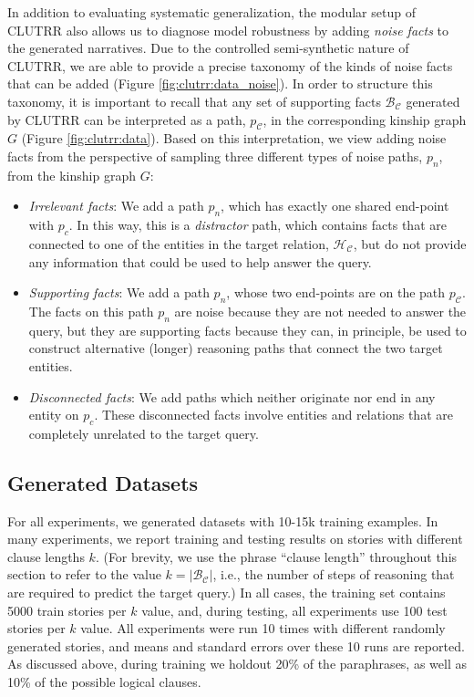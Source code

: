\documentclass[letterpaper, 12pt]{report}
\begin{document}
In addition to evaluating systematic generalization, the modular setup of CLUTRR also allows us to diagnose model robustness by adding \textit{noise facts} to the generated narratives.
Due to the controlled semi-synthetic nature of CLUTRR, we are able to provide a precise taxonomy of the kinds of noise facts that can be added (Figure \ref{fig:clutrr:data_noise}).
In order to structure this taxonomy, it is important to recall that any set of supporting facts $\mathcal{B}_{\mathcal{C}}$ generated by CLUTRR can be interpreted as a path, $p_{\mathcal{C}}$, in the corresponding kinship graph $G$ (Figure \ref{fig:clutrr:data}).
Based on this interpretation, we view adding noise facts from the perspective of sampling three different types of noise paths, $p_n$, from the kinship graph $G$:
\begin{itemize}[  leftmargin=10pt, topsep=0pt, itemsep=0pt, parsep=0pt]
    \item \textit{Irrelevant facts}: We add a path $p_n$, which has exactly one shared end-point with $p_c$. In this way, this is a \textit{distractor} path,
    which contains facts that are connected to one of the entities in the target relation, $\mathcal{H}_{\mathcal{C}}$, but do not provide any information that could be used to help answer the query. %
     \item \textit{Supporting facts}:
    We add a path $p_n$, whose two end-points are on the path $p_{\mathcal{C}}$.
    The facts on this path $p_n$ are noise because they are not needed to answer the query, but they are supporting facts because they can, in principle, be used to construct alternative (longer) reasoning paths that connect the two target entities.
    \item \textit{Disconnected facts}: We add paths which neither originate nor end in any entity on $p_c$. These disconnected facts involve entities and relations that are completely unrelated to the target query.
\end{itemize}

\subsection{Generated Datasets}

For all experiments, we generated datasets with 10-15k training examples.
In many experiments, we report training and testing results on stories with different clause lengths $k$.
(For brevity, we use the phrase ``clause length'' throughout this section to refer to the value $k=|\mathcal{B}_{\mathcal{C}}|$, i.e., the number of steps of reasoning that are required to predict the target query.)
In all cases, the training set contains 5000 train stories per $k$ value, and, during testing, all experiments use 100 test stories per $k$ value.
All experiments were run 10 times with different randomly generated stories, and means and standard errors over these 10 runs are reported.
As discussed above, during training we holdout 20\% of the paraphrases, as well as 10\% of the possible logical clauses.
\end{document}
